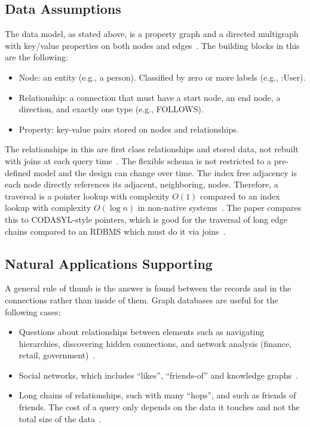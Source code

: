\documentclass[10pt,a4paper,twocolumn]{article}
\begin{document}
\subsection{Data Assumptions}

The data model, as stated above, is a property graph and a directed multigraph with key/value properties on both nodes and edges~\cite{neo4j2026graphdb,stonebraker2024whatgoesaround}. The building blocks in this are the following:

\begin{itemize}
  \item Node: an entity (e.g., a person). Classified by zero or more labels (e.g., :User).
  \item Relationship: a connection that must have a start node, an end node, a direction, and exactly one type (e.g., FOLLOWS).
  \item Property: key-value pairs stored on nodes and relationships.
\end{itemize}

The relationships in this are first class relationships and stored data, not rebuilt with joins at each query time~\cite{dbdb2026neo4j}. The flexible schema is not restricted to a pre-defined model and the design can change over time. The index free adjacency is each node directly references its adjacent, neighboring, nodes. Therefore, a traversal is a pointer lookup with complexity $O(1)$ compared to an index lookup with complexity $O(\log n)$ in non-native systems~\cite{stegeman2023native}. The paper compares this to CODASYL-style pointers, which is good for the traversal of long edge chains compared to an RDBMS which must do it via joins~\cite{stonebraker2024whatgoesaround}.

\subsection{Natural Applications Supporting}

A general rule of thumb is the answer is found between the records and in the connections rather than inside of them. Graph databases are useful for the following cases:

\begin{itemize}
  \item Questions about relationships between elements such as navigating hierarchies, discovering hidden connections, and network analysis (finance, retail, government)~\cite{neo4j2026graphdb}.
  \item Social networks, which includes ``likes'', ``friends-of'' and knowledge graphs~\cite{stonebraker2024whatgoesaround}.
  \item Long chains of relationships, such with many ``hops'', and such as friends of friends. The cost of a query only depends on the data it touches and not the total size of the data~\cite{stegeman2023native}.
\end{itemize}
\end{document}
